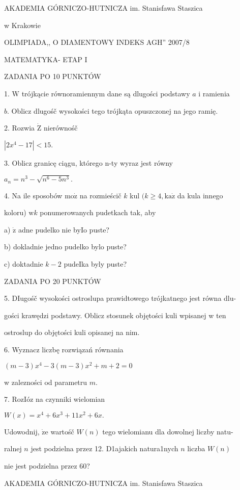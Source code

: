 \documentclass[a4paper,12pt]{article}
\begin{document}
AKADEMIA GÓRNICZO-HUTNICZA im. Stanisfawa Staszica

w Krakowie

OLIMPIADA,, O DIAMENTOWY INDEKS AGH'' 2007/8

MATEMATYKA- ETAP I

ZADANIA PO 10 PUNKTÓW

1. $\mathrm{W}$ trójkącie równoramiennym dane są dlugości podstawy $a$ i ramienia

$b$. Oblicz dlugośč wysokości tego trójkąta opuszczonej na jego ramię.

2. Rozwia $\dot{\mathrm{Z}}$ nierównośč

$|2x^{4}-17|<15.$

3. Oblicz granicę ciągu, którego n-ty wyraz jest równy

$a_{n}=n^{3}-\sqrt{n^{6}-5n^{3}}.$

4. Na ile sposobów $\mathrm{m}\mathrm{o}\dot{\mathrm{z}}$ na rozmieścič $k$ kul $(k \geq 4, \mathrm{k}\mathrm{a}\dot{\mathrm{z}}$ da kula innego

koloru) $\mathrm{w}k$ ponumerowanych pudetkach tak, aby

a) $\dot{\mathrm{z}}$ adne pudelko nie byIo puste?

b) dokladnie jedno pudelko bylo puste?

c) doktadnie $k-2$ pudeIka byly puste?

ZADANIA PO 20 PUNKTÓW

5. DIugośč wysokości ostroslupa prawidtowego trójkatnego jest równa dlu-

gości krawędzi podstawy. Oblicz stosunek objętości kuli wpisanej w ten

ostroslup do objętości kuli opisanej na nim.

6. Wyznacz liczbę rozwiązań równania

$(m-3)x^{4}-3(m-3)x^{2}+m+2=0$

w zalezności od parametru $m.$

7. RozIóz na czynniki wielomian

$W(x)=x^{4}+6x^{3}+11x^{2}+6x.$

Udowodnij, $\dot{\mathrm{z}}\mathrm{e}$ wartośč $W(n)$ tego wielomianu dla dowolnej liczby natu-

ralnej $n$ jest podzielna przez 12. D1ajakich natura1nych $n$ liczba $W(n)$

nie jest podzielna przez 60?





AKADEMIA GÓRNICZO-HUTNICZA im. Stanisfawa Staszica
\end{document}
